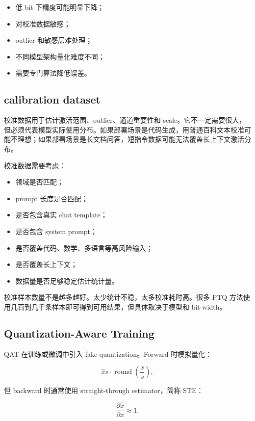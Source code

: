 \begin{itemize}
\item 低 bit 下精度可能明显下降；
\item 对校准数据敏感；
\item outlier 和敏感层难处理；
\item 不同模型架构量化难度不同；
\item 需要专门算法降低误差。
\end{itemize}

\subsection{calibration dataset}
\label{subsec:calibration-dataset}

校准数据用于估计激活范围、outlier、通道重要性和 scale。它不一定需要很大，但必须代表模型实际使用分布。如果部署场景是代码生成，用普通百科文本校准可能不理想；如果部署场景是长文档问答，短指令数据可能无法覆盖长上下文激活分布。

校准数据需要考虑：

\begin{itemize}
\item 领域是否匹配；
\item prompt 长度是否匹配；
\item 是否包含真实 chat template；
\item 是否包含 system prompt；
\item 是否覆盖代码、数学、多语言等高风险输入；
\item 是否覆盖长上下文；
\item 数据量是否足够稳定估计统计量。
\end{itemize}

校准样本数量不是越多越好。太少统计不稳，太多校准耗时高。很多 PTQ 方法使用几百到几千条样本即可得到可用结果，但具体取决于模型和 bit-width。

\subsection{Quantization-Aware Training}
\label{subsec:quantization-aware-training}

QAT 在训练或微调中引入 fake quantization。Forward 时模拟量化：

\[
\hat{x}
s\cdot
\operatorname{round}
\left(
\frac{x}{s}
\right),
\]

但 backward 时通常使用 straight-through estimator，简称 STE：

\[
\frac{\partial \hat{x}}{\partial x}\approx 1.
\]

